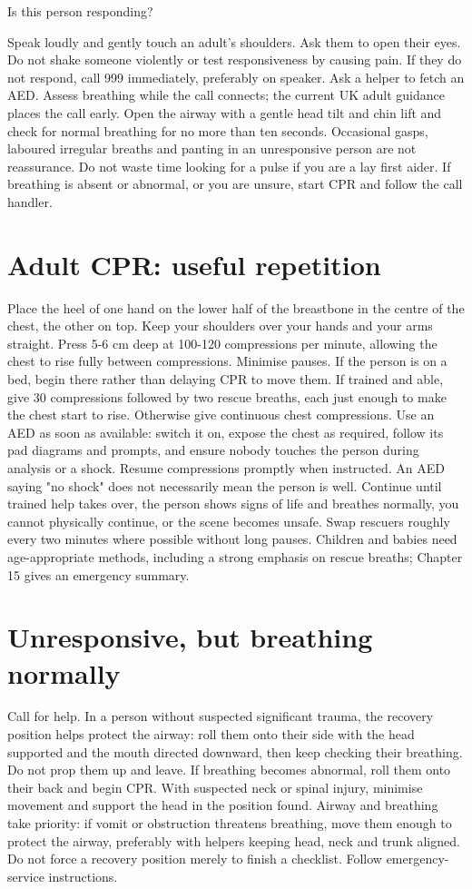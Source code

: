 \documentclass[10pt,openright]{book}
\begin{document}
Is this person responding?

Speak loudly and gently touch an adult's shoulders. Ask them to open their eyes. Do not shake someone violently or test responsiveness by causing pain. If they do not respond, call 999 immediately, preferably on speaker. Ask a helper to fetch an AED. Assess breathing while the call connects; the current UK adult guidance places the call early. Open the airway with a gentle head tilt and chin lift and check for normal breathing for no more than ten seconds. Occasional gasps, laboured irregular breaths and panting in an unresponsive person are not reassurance. Do not waste time looking for a pulse if you are a lay first aider. If breathing is absent or abnormal, or you are unsure, start CPR and follow the call handler.

\section*{Adult CPR: useful repetition}
Place the heel of one hand on the lower half of the breastbone in the centre of the chest, the other on top. Keep your shoulders over your hands and your arms straight. Press 5-6 cm deep at 100-120 compressions per minute, allowing the chest to rise fully between compressions. Minimise pauses. If the person is on a bed, begin there rather than delaying CPR to move them. If trained and able, give 30 compressions followed by two rescue breaths, each just enough to make the chest start to rise. Otherwise give continuous chest compressions. Use an AED as soon as available: switch it on, expose the chest as required, follow its pad diagrams and prompts, and ensure nobody touches the person during analysis or a shock. Resume compressions promptly when instructed. An AED saying "no shock" does not necessarily mean the person is well. Continue until trained help takes over, the person shows signs of life and breathes normally, you cannot physically continue, or the scene becomes unsafe. Swap rescuers roughly every two minutes where possible without long pauses. Children and babies need age-appropriate methods, including a strong emphasis on rescue breaths; Chapter 15 gives an emergency summary.

\section*{Unresponsive, but breathing normally}
Call for help. In a person without suspected significant trauma, the recovery position helps protect the airway: roll them onto their side with the head supported and the mouth directed downward, then keep checking their breathing. Do not prop them up and leave. If breathing becomes abnormal, roll them onto their back and begin CPR. With suspected neck or spinal injury, minimise movement and support the head in the position found. Airway and breathing take priority: if vomit or obstruction threatens breathing, move them enough to protect the airway, preferably with helpers keeping head, neck and trunk aligned. Do not force a recovery position merely to finish a checklist. Follow emergency-service instructions.
\end{document}
